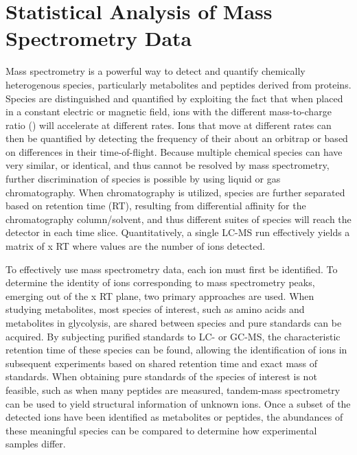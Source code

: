 
\chapter{Statistical Analysis of Mass Spectrometry Data\label{ch:quant_anal}}

Mass spectrometry is a powerful way to detect and quantify chemically heterogenous species, particularly metabolites and peptides derived from proteins. Species are distinguished and quantified by exploiting the fact that when placed in a constant electric or magnetic field, ions with the different mass-to-charge ratio () will accelerate at different rates.  Ions that move at different rates can then be quantified by detecting the frequency of their  about an orbitrap or based on differences in their time-of-flight.  Because multiple chemical species can have very similar, or identical,  and thus cannot be resolved by mass spectrometry, further discrimination of species is possible by using liquid or gas chromatography.  When chromatography is utilized, species are further separated based on retention time (RT), resulting from differential affinity for the chromatography column/solvent, and thus different suites of species will reach the detector in each time slice.  Quantitatively, a single LC-MS run effectively yields a matrix of  x RT where values are the number of ions detected.  

To effectively use mass spectrometry data, each ion must first be identified. To determine the identity of ions corresponding to mass spectrometry peaks, emerging out of the  x RT plane, two primary approaches are used.  When studying metabolites, most species of interest, such as amino acids and metabolites in glycolysis, are shared between species and pure standards can be acquired.  By subjecting purified standards to LC- or GC-MS, the characteristic retention time of these species can be found, allowing the identification of ions in subsequent experiments based on shared retention time and exact mass of standards.  When obtaining pure standards of the species of interest is not feasible, such as when many peptides are measured, tandem-mass spectrometry can be used to yield structural information of unknown ions.  Once a subset of the detected ions have been identified as metabolites or peptides, the abundances of these meaningful species can be compared to determine how experimental samples differ.

